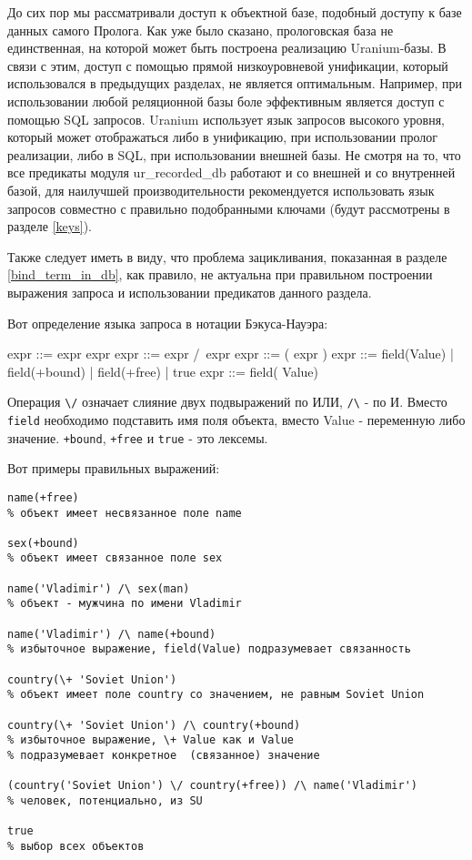 \documentclass[a4paper]{book}
\def\ur{Uranium}
\begin{document}
До сих пор мы рассматривали доступ к объектной базе, подобный
доступу к базе данных самого Пролога. Как уже было сказано,
прологовская база не единственная, на которой может быть
построена реализацию \ur-базы. В связи с этим, доступ с помощью
прямой низкоуровневой унификации, который использовался в
предыдущих разделах, не является оптимальным. Например, при
использовании любой реляционной базы боле эффективным является
доступ с помощью SQL запросов. \ur{} использует язык запросов
высокого уровня, который может отображаться либо в унификацию,
при использовании пролог реализации, либо в SQL, при
использовании внешней базы. Не смотря на то, что все предикаты
модуля ur\_recorded\_db работают и со внешней и со внутренней
базой, для наилучшей производительности рекомендуется
использовать язык запросов совместно с правильно подобранными
ключами (будут рассмотрены в разделе \ref{keys}).

Также следует иметь в виду, что проблема зацикливания, показанная
в разделе \ref{bind_term_in_db}, как правило, не актуальна при
правильном построении выражения запроса и использовании
предикатов данного раздела.

Вот определение языка запроса в нотации Бэкуса-Науэра:

\begin{genexample}{}{}
expr ::= expr \/ expr
expr ::= expr /\ expr
expr ::= ( expr )
expr ::= field(Value) | field(+bound) | field(+free) | true
expr ::= field(\+ Value)
\end{genexample}
 
Операция \verb|\/| означает слияние двух подвыражений по ИЛИ,
\verb|/\| - по И. Вместо \verb|field| необходимо подставить имя
поля объекта, вместо Value - переменную либо
значение. \verb|+bound|, \verb|+free| и \verb|true| - это
лексемы.

Вот примеры правильных выражений:

\begin{verbatim}
name(+free)   
% объект имеет несвязанное поле name

sex(+bound)   
% объект имеет связанное поле sex

name('Vladimir') /\ sex(man) 
% объект - мужчина по имени Vladimir

name('Vladimir') /\ name(+bound) 
% избыточное выражение, field(Value) подразумевает связанность

country(\+ 'Soviet Union') 
% объект имеет поле country со значением, не равным Soviet Union

country(\+ 'Soviet Union') /\ country(+bound) 
% избыточное выражение, \+ Value как и Value 
% подразумевает конкретное  (связанное) значение

(country('Soviet Union') \/ country(+free)) /\ name('Vladimir') 
% человек, потенциально, из SU

true
% выбор всех объектов
\end{verbatim}
\end{document}
